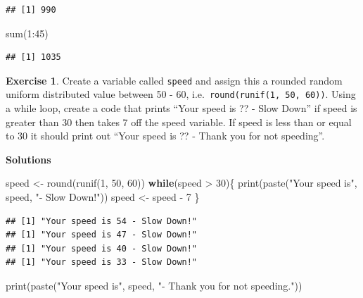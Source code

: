 \documentclass[
]{book}
\newenvironment{Shaded}{\begin{snugshade}}{\end{snugshade}}
\newcommand{\ControlFlowTok}[1]{\textcolor[rgb]{0.13,0.29,0.53}{\textbf{#1}}}
\newcommand{\DecValTok}[1]{\textcolor[rgb]{0.00,0.00,0.81}{#1}}
\newcommand{\FunctionTok}[1]{\textcolor[rgb]{0.00,0.00,0.00}{#1}}
\newcommand{\NormalTok}[1]{#1}
\newcommand{\OtherTok}[1]{\textcolor[rgb]{0.56,0.35,0.01}{#1}}
\newcommand{\SpecialCharTok}[1]{\textcolor[rgb]{0.00,0.00,0.00}{#1}}
\newcommand{\StringTok}[1]{\textcolor[rgb]{0.31,0.60,0.02}{#1}}
\theoremstyle{definition}
\theoremstyle{definition}
\theoremstyle{definition}
\newtheorem{exercise}{Exercise}[chapter]
\theoremstyle{definition}
\theoremstyle{remark}
\begin{document}
\begin{verbatim}
## [1] 990
\end{verbatim}

\begin{Shaded}
\begin{Highlighting}[]
\FunctionTok{sum}\NormalTok{(}\DecValTok{1}\SpecialCharTok{:}\DecValTok{45}\NormalTok{)}
\end{Highlighting}
\end{Shaded}

\begin{verbatim}
## [1] 1035
\end{verbatim}

\begin{exercise}
Create a variable called \texttt{speed} and assign this a rounded random uniform distributed value between 50 - 60, i.e.~\texttt{round(runif(1,\ 50,\ 60))}. Using a while loop, create a code that prints ``Your speed is ?? - Slow Down'' if speed is greater than 30 then takes 7 off the speed variable. If speed is less than or equal to 30 it should print out ``Your speed is ?? - Thank you for not speeding''.
\end{exercise}

\textbf{Solutions}

\begin{Shaded}
\begin{Highlighting}[]
\NormalTok{speed }\OtherTok{\textless{}{-}} \FunctionTok{round}\NormalTok{(}\FunctionTok{runif}\NormalTok{(}\DecValTok{1}\NormalTok{, }\DecValTok{50}\NormalTok{, }\DecValTok{60}\NormalTok{))}
\ControlFlowTok{while}\NormalTok{(speed }\SpecialCharTok{\textgreater{}} \DecValTok{30}\NormalTok{)\{}
  \FunctionTok{print}\NormalTok{(}\FunctionTok{paste}\NormalTok{(}\StringTok{"Your speed is"}\NormalTok{, speed, }\StringTok{"{-} Slow Down!"}\NormalTok{))}
\NormalTok{  speed }\OtherTok{\textless{}{-}}\NormalTok{ speed }\SpecialCharTok{{-}} \DecValTok{7}
\NormalTok{\}}
\end{Highlighting}
\end{Shaded}

\begin{verbatim}
## [1] "Your speed is 54 - Slow Down!"
## [1] "Your speed is 47 - Slow Down!"
## [1] "Your speed is 40 - Slow Down!"
## [1] "Your speed is 33 - Slow Down!"
\end{verbatim}

\begin{Shaded}
\begin{Highlighting}[]
\FunctionTok{print}\NormalTok{(}\FunctionTok{paste}\NormalTok{(}\StringTok{"Your speed is"}\NormalTok{, speed, }\StringTok{"{-} Thank you for not speeding."}\NormalTok{))}
\end{Highlighting}
\end{Shaded}
\end{document}
